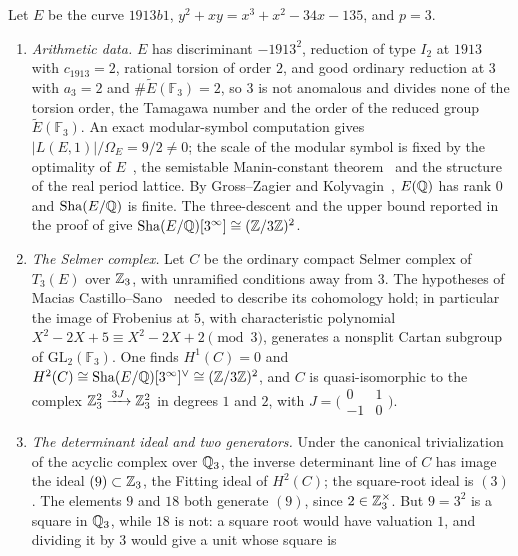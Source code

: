 \begin{example}[An ordinary Selmer complex at $p=3$]\label{ex:closure:1913b1}
Let $E$ be the curve $1913b1$, $y^2+xy=x^3+x^2-34x-135$, and $p=3$.
\begin{enumerate}
\item \emph{Arithmetic data.}  $E$ has discriminant $-1913^2$, reduction
  of type $I_2$ at $1913$ with $c_{1913}=2$, rational torsion of order
  $2$, and good ordinary reduction at $3$ with $a_3=2$ and
  $\#\widetilde E(\mathbb F_3)=2$, so $3$ is not anomalous and divides none of the torsion order, the
  Tamagawa number and the order of the reduced group
  $\widetilde E(\mathbb F_3)$.  An exact modular-symbol computation gives
  $|L(E,1)|/\Omega_E=9/2\neq0$; the scale of the modular symbol is fixed
  by the optimality of $E$~\citep[Table~1]{Miller2011}, the semistable
  Manin-constant theorem~\citep{Cesnavicius2018} and the structure of the
  real period lattice.  By Gross--Zagier and
  Kolyvagin~\citep{GrossZagier1986,Kolyvagin1989}, $E(\mathbb{Q})$ has rank $0$
  and $\operatorname{Sha}(E/\mathbb{Q})$ is finite.  The
  three-descent and the upper bound reported in the proof of
  \citet[Theorem~7.2]{Miller2011} give $\operatorname{Sha}(E/\mathbb{Q})[3^\infty]\cong(\mathbb{Z}/3\mathbb{Z})^2$.
\item \emph{The Selmer complex.}  Let $C$ be the ordinary compact Selmer
  complex of $T_3(E)$ over $\mathbb{Z}_3$, with unramified conditions away from
  $3$.  The hypotheses of Macias Castillo--Sano~\citep{MaciasCastilloSano2026}
  needed to describe its cohomology hold; in particular the image of
  Frobenius at $5$, with characteristic polynomial $X^2-2X+5\equiv
  X^2-2X+2\pmod 3$, generates a nonsplit Cartan subgroup of
  $\mathrm{GL}_2(\mathbb F_3)$.  One finds $H^1(C)=0$ and
  $H^2(C)\cong\operatorname{Sha}(E/\mathbb{Q})[3^\infty]^{\vee}\cong(\mathbb{Z}/3\mathbb{Z})^2$, and $C$ is
  quasi-isomorphic to the complex $\mathbb{Z}_3^2\xrightarrow{\,3J\,}\mathbb{Z}_3^2$ in
  degrees $1$ and $2$, with
  $J=\bigl(\begin{smallmatrix}0&1\\-1&0\end{smallmatrix}\bigr)$.
\item \emph{The determinant ideal and two generators.}  Under the
  canonical trivialization of the acyclic complex over $\mathbb{Q}_3$, the inverse
  determinant line of $C$ has image the ideal $(9)\subset\mathbb{Z}_3$, the
  Fitting ideal of $H^2(C)$; the square-root ideal is $(3)$.  The elements
  $9$ and $18$ both generate $(9)$, since $2\in\mathbb{Z}_3^\times$.  But $9=3^2$
  is a square in $\mathbb{Q}_3$, while $18$ is not: a square root would have
  valuation $1$, and dividing it by $3$ would give a unit whose square is

\end{enumerate}
\end{example}
